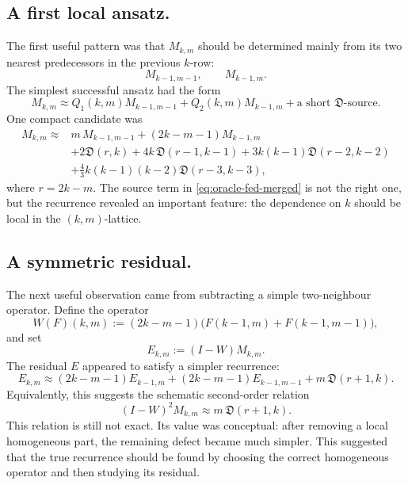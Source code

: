 \documentclass[11pt]{amsart}
\numberwithin{equation}{section}
\theoremstyle{remark}
\newcommand{\Dder}{\mathfrak D}
\begin{document}
\subsection{A first local ansatz.}
The first useful pattern was that $M_{k,m}$ should be determined mainly
from its two nearest predecessors in the previous $k$-row:
\[
  M_{k-1,m-1},\qquad M_{k-1,m}.
\]
The simplest successful ansatz had the form
\[
  M_{k,m}
  \approx
  Q_1(k,m)M_{k-1,m-1}
  +
  Q_2(k,m)M_{k-1,m}
  +
  \text{a short }\Dder\text{-source}.
\]
One compact candidate was
\begin{equation}\label{eq:oracle-fed-merged}
\begin{aligned}
M_{k,m} \approx {}&
m\,M_{k-1,m-1}+(2k-m-1)M_{k-1,m}  \\
&+2\Dder(r,k)
+4k\,\Dder(r-1,k-1)
+3k(k-1)\Dder(r-2,k-2)  \\
&+\frac{4}{3}k(k-1)(k-2)\Dder(r-3,k-3),
\end{aligned}
\end{equation}
where $r=2k-m$.  The source term in \eqref{eq:oracle-fed-merged} is not
the right one, but the recurrence revealed an important feature: the
dependence on $k$ should be local in the $(k,m)$-lattice.

\subsection{A symmetric residual.}
The next useful observation came from subtracting a simple two-neighbour
operator.  Define the operator
\[
  W(F)(k,m):=(2k-m-1)\bigl(F(k-1,m)+F(k-1,m-1)\bigr),
\]
and set
\[
  E_{k,m}:=(I-W)M_{k,m}.
\]
The residual $E$ appeared to satisfy a simpler recurrence:
\begin{equation}\label{eq:ward-defect-merged}
  E_{k,m}
  \approx
  (2k-m-1)E_{k-1,m}
  +(2k-m-1)E_{k-1,m-1}
  +m\,\Dder(r+1,k).
\end{equation}
Equivalently, this suggests the schematic second-order relation
\[
  (I-W)^2M_{k,m}\approx m\,\Dder(r+1,k).
\]
This relation is still not exact.  Its value was conceptual: after removing
a local homogeneous part, the remaining defect became much simpler.  This
suggested that the true recurrence should be found by choosing the correct
homogeneous operator and then studying its residual.
\end{document}
